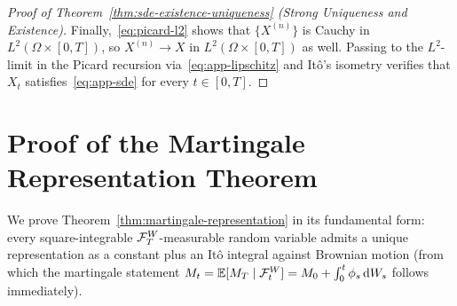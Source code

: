 \begin{proof}[Proof of Theorem~\ref{thm:sde-existence-uniqueness} (Strong Uniqueness and Existence)]
    Finally,~\eqref{eq:picard-l2} shows that $\{X^{(n)}\}$ is Cauchy in $L^2(\Omega \times [0, T])$, so $X^{(n)} \to X$ in $L^2(\Omega \times [0, T])$ as well. Passing to the $L^2$-limit in the Picard recursion via~\eqref{eq:app-lipschitz} and It\^o's isometry verifies that $X_t$ satisfies~\eqref{eq:app-sde} for every $t \in [0, T]$.
\end{proof}

\section{Proof of the Martingale Representation Theorem}\label{sec:proof-mrt}

We prove Theorem~\ref{thm:martingale-representation} in its fundamental form: every square-integrable $\mathcal{F}_T^W$-measurable random variable admits a unique representation as a constant plus an It\^o integral against Brownian motion (from which the martingale statement $M_t = \mathbb{E}[M_T \mid \mathcal{F}_t^W] = M_0 + \int_0^t \phi_s\,\mathrm{d} W_s$ follows immediately).

